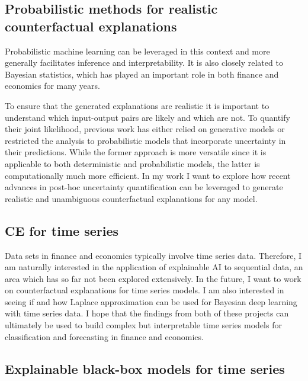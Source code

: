 \documentclass[
]{acmconf}
\begin{document}
\hypertarget{probabilistic-methods-for-realistic-counterfactual-explanations}{%
\subsection{Probabilistic methods for realistic counterfactual
explanations}\label{probabilistic-methods-for-realistic-counterfactual-explanations}}

Probabilistic machine learning can be leveraged in this context and more
generally facilitates inference and interpretability. It is also closely
related to Bayesian statistics, which has played an important role in
both finance and economics for many years.

To ensure that the generated explanations are realistic it is important
to understand which input-output pairs are likely and which are not. To
quantify their joint likelihood, previous work has either relied on
generative models or restricted the analysis to probabilistic models
that incorporate uncertainty in their predictions. While the former
approach is more versatile since it is applicable to both deterministic
and probabilistic models, the latter is computationally much more
efficient. In my work I want to explore how recent advances in post-hoc
uncertainty quantification can be leveraged to generate realistic and
unambiguous counterfactual explanations for any model.

\hypertarget{ce-for-time-series}{%
\subsection{CE for time series}\label{ce-for-time-series}}

Data sets in finance and economics typically involve time series data.
Therefore, I am naturally interested in the application of explainable
AI to sequential data, an area which has so far not been explored
extensively. In the future, I want to work on counterfactual
explanations for time series models. I am also interested in seeing if
and how Laplace approximation can be used for Bayesian deep learning
with time series data. I hope that the findings from both of these
projects can ultimately be used to build complex but interpretable time
series models for classification and forecasting in finance and
economics.

\hypertarget{explainable-black-box-models-for-time-series}{%
\subsection{Explainable black-box models for time
series}\label{explainable-black-box-models-for-time-series}}
\end{document}
